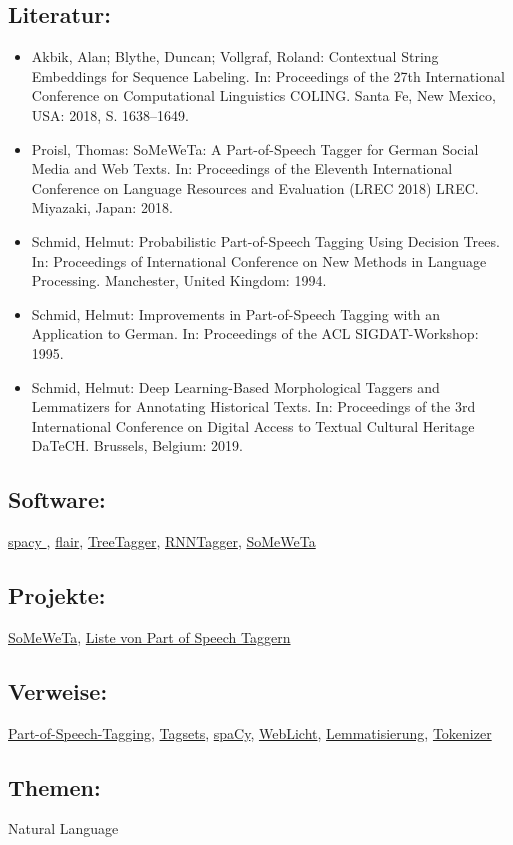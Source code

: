 \documentclass{article}
\begin{document}
        \subsection*{Literatur:}\begin{itemize}\item Akbik, Alan; Blythe, Duncan; Vollgraf, Roland: Contextual String Embeddings for Sequence Labeling. In: Proceedings of the 27th International Conference on Computational Linguistics COLING. Santa Fe, New Mexico, USA: 2018, S. 1638–1649.\item Proisl, Thomas: SoMeWeTa: A Part-of-Speech Tagger for German Social Media and Web Texts. In: Proceedings of the Eleventh International Conference on Language Resources and Evaluation (LREC 2018) LREC. Miyazaki, Japan: 2018.\item Schmid, Helmut: Probabilistic Part-of-Speech Tagging Using Decision Trees. In: Proceedings of International Conference on New Methods in Language Processing. Manchester, United Kingdom: 1994.\item Schmid, Helmut: Improvements in Part-of-Speech Tagging with an Application to German. In: Proceedings of the ACL SIGDAT-Workshop: 1995.\item Schmid, Helmut: Deep Learning-Based Morphological Taggers and Lemmatizers for Annotating Historical Texts. In: Proceedings of the 3rd International Conference on Digital Access to Textual Cultural Heritage DaTeCH. Brussels, Belgium: 2019.\end{itemize}\subsection*{Software:}\href{https://spacy.io/}{spacy }, \href{https://github.com/zalandoresearch/flair}{flair}, \href{https://www.cis.uni-muenchen.de/~schmid/tools/TreeTagger/}{TreeTagger}, \href{https://www.cis.uni-muenchen.de/~schmid/tools/RNNTagger/}{RNNTagger}, \href{https://github.com/tsproisl/SoMeWeTa}{SoMeWeTa}\subsection*{Projekte:}\href{https://github.com/tsproisl/SoMeWeTa}{SoMeWeTa}, \href{https://nlp.stanford.edu/links/statnlp.html#Taggers}{Liste von Part of Speech Taggern}\subsection*{Verweise:}\href{https://gams.uni-graz.at/o:konde.156}{Part-of-Speech-Tagging}, \href{https://gams.uni-graz.at/o:konde.177}{Tagsets}, \href{https://gams.uni-graz.at/o:konde.170}{spaCy}, \href{https://gams.uni-graz.at/o:konde.212}{WebLicht}, \href{https://gams.uni-graz.at/o:konde.115}{Lemmatisierung}, \href{https://gams.uni-graz.at/o:konde.216}{Tokenizer}\subsection*{Themen:}Natural Language 
\end{document}
